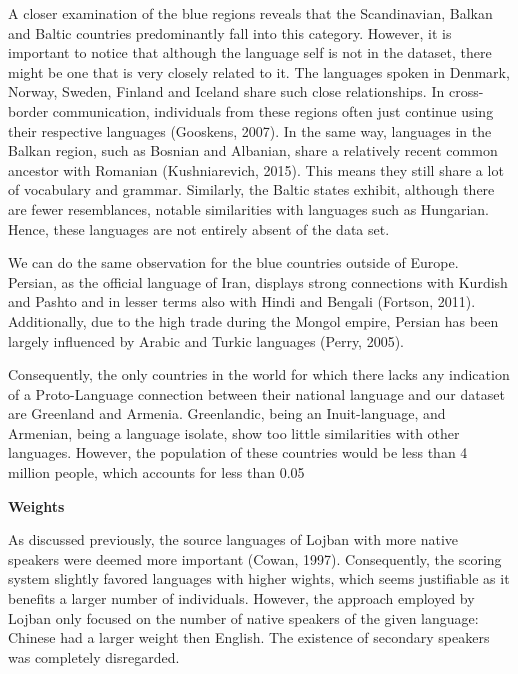 \vspace{0.3cm}

\noindent

A closer examination of the blue regions reveals that the Scandinavian, Balkan and Baltic countries predominantly fall into this category. However, it is important to notice that although the language self is not in the dataset, there might be one that is very closely related to it. The languages spoken in Denmark, Norway, Sweden, Finland and Iceland share such close relationships. In cross-border communication, individuals from these regions often just continue using their respective languages (Gooskens, 2007). In the same way, languages in the Balkan region, such as Bosnian and Albanian, share a relatively recent common ancestor with Romanian (Kushniarevich, 2015). This means they still share a lot of vocabulary and grammar. Similarly, the Baltic states exhibit, although there are fewer resemblances, notable similarities with languages such as Hungarian. Hence, these languages are not entirely absent of the data set.

We can do the same observation for the blue countries outside of Europe. Persian, as the official language of Iran, displays strong connections with Kurdish and Pashto and in lesser terms also with Hindi and Bengali (Fortson, 2011). Additionally, due to the high trade during the Mongol empire, Persian has been largely influenced by Arabic and Turkic languages (Perry, 2005). 

Consequently, the only countries in the world for which there lacks any indication of a Proto-Language connection between their national language and our dataset are Greenland and Armenia. Greenlandic, being an Inuit-language, and Armenian, being a language isolate, show too little similarities with other languages. However, the population of these countries would be less than 4 million people, which accounts for less than 0.05%

\textbf{Weights} 

As discussed previously, the source languages of Lojban with more native speakers were deemed more important (Cowan, 1997). Consequently, the scoring system slightly favored languages with higher wights, which seems justifiable as it benefits a larger number of individuals. However, the approach employed by Lojban only focused on the number of native speakers of the given language: Chinese had a larger weight then English. The existence of secondary speakers was completely disregarded. 

